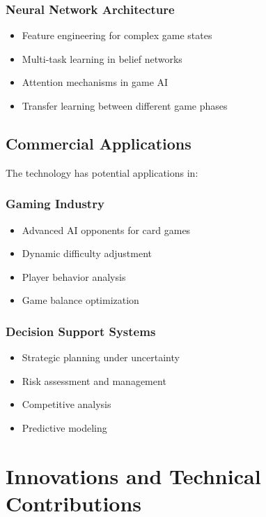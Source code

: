 \documentclass[conference]{IEEEtran}
\begin{document}
\subsubsection{Neural Network Architecture}
\begin{itemize}
    \item Feature engineering for complex game states
    \item Multi-task learning in belief networks
    \item Attention mechanisms in game AI
    \item Transfer learning between different game phases
\end{itemize}

\subsection{Commercial Applications}

The technology has potential applications in:

\subsubsection{Gaming Industry}
\begin{itemize}
    \item Advanced AI opponents for card games
    \item Dynamic difficulty adjustment
    \item Player behavior analysis
    \item Game balance optimization
\end{itemize}

\subsubsection{Decision Support Systems}
\begin{itemize}
    \item Strategic planning under uncertainty
    \item Risk assessment and management
    \item Competitive analysis
    \item Predictive modeling
\end{itemize}

\section{Innovations and Technical Contributions}
\end{document}
